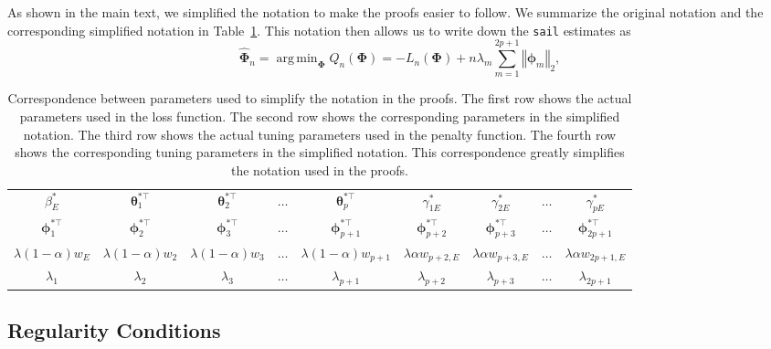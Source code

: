 \documentclass[a4paper,fleqn]{cas-sc}
\newcommand{\btheta}{\boldsymbol{\theta}}
\DeclareMathOperator*{\argmin}{arg\,min}
\begin{document}
As shown in the main text, we simplified the notation to make the proofs easier to follow. We summarize the original notation and the corresponding simplified notation in Table~\ref{tab:proofs}. This notation then allows us to write down the \texttt{sail} estimates as
	\begin{equation}
	\widehat{\boldsymbol{\Phi}}_{n}=\argmin_{\boldsymbol{\Phi}}Q_{n}(\boldsymbol{\Phi})=-L_{n}(\boldsymbol{\Phi})+n\lambda_{m}\sum_{m=1}^{2p+1}\left\Vert \boldsymbol{\phi}_{m}\right\Vert _{2},
	\end{equation}	
	
	\begin{table}[h]
	    \centering
	    \begin{tabular}{|c|c|c|c|c|c|c|c|c|}
	    \hline
	       $\beta_{E}^{*}$ & $\btheta_{1}^{*\top}$ & $\btheta_{2}^{*\top}$ & $\ldots$ & $\btheta_{p}^{*\top}$ & $\gamma_{1E}^{*}$ & $\gamma_{2E}^{*}$ & $\ldots$ & $\gamma_{pE}^{*}$ \\
	       \rule{0pt}{4ex}    
	       $\boldsymbol{\phi}_{1}^{*\top}$ & $\boldsymbol{\phi}_{2}^{*\top}$ & $\boldsymbol{\phi}_{3}^{*\top}$ & $\ldots$ & $\boldsymbol{\phi}_{p+1}^{*\top}$ & $\boldsymbol{\phi}_{p+2}^{*\top}$ &
	       $\boldsymbol{\phi}_{p+3}^{*\top}$ & $\ldots$ & $\boldsymbol{\phi}_{2p+1}^{*\top}$ \\
	       \midrule
	       	       \rule{0pt}{4ex}    
$\lambda(1-\alpha)w_{E}$ & $\lambda(1-\alpha)w_{2}$ & $\lambda(1-\alpha)w_{3}$ & $\ldots$ &  $\lambda(1-\alpha)w_{p+1}$ & $\lambda\alpha w_{p+2,E}$ & $\lambda\alpha w_{p+3,E}$ & $\ldots$ &  $\lambda\alpha w_{2p+1,E}$\\
	       	       \rule{0pt}{4ex}    
$\lambda_1$ & $\lambda_2$ & $\lambda_3$ & $\ldots$ & $\lambda_{p+1}$ & $\lambda_{p+2}$ & $\lambda_{p+3}$ & $\ldots$ & $\lambda_{2p+1}$ \\
	       \hline
	    \end{tabular}
	    \caption{Correspondence between parameters used to simplify the notation in the proofs. The first row shows the actual parameters used in the loss function. The second row shows the corresponding parameters in the simplified notation. The third row shows the actual tuning parameters used in the penalty function. The fourth row shows the corresponding tuning parameters in the simplified notation. This correspondence greatly simplifies the notation used in the proofs. }
	    \label{tab:proofs}
	\end{table}

\FloatBarrier
\subsection{Regularity Conditions}
\end{document}
